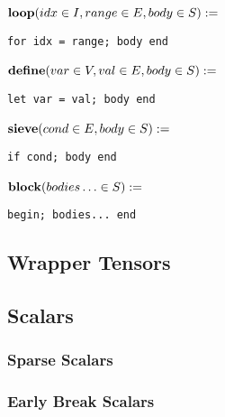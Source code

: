 \noindent\begin{minipage}{\leftwidth}
\raggedleft $\text{\textbf{loop}}(idx \in I, range \in E, body \in S) :=$~
\end{minipage}%
\begin{minipage}{\rightwidth}
\begin{verbatim}
for idx = range; body end
\end{verbatim}
\end{minipage}

\noindent\begin{minipage}{\leftwidth}
\raggedleft $\text{\textbf{define}}(var \in V, val \in E, body \in S) :=$~
\end{minipage}%
\begin{minipage}{\rightwidth}
\begin{verbatim}
let var = val; body end
\end{verbatim}
\end{minipage}

\noindent\begin{minipage}{\leftwidth}
\raggedleft $\text{\textbf{sieve}}(cond \in E, body \in S) :=$~
\end{minipage}%
\begin{minipage}{\rightwidth}
\begin{verbatim}
if cond; body end
\end{verbatim}
\end{minipage}

\noindent\begin{minipage}{\leftwidth}
\raggedleft $\text{\textbf{block}}(bodies\ldots \in S) :=$~
\end{minipage}%
\begin{minipage}{\rightwidth}
\begin{verbatim}
begin; bodies... end
\end{verbatim}
\end{minipage}

\subsection{Wrapper Tensors}

\subsection{Scalars}

\subsubsection{Sparse Scalars}
\subsubsection{Early Break Scalars}

